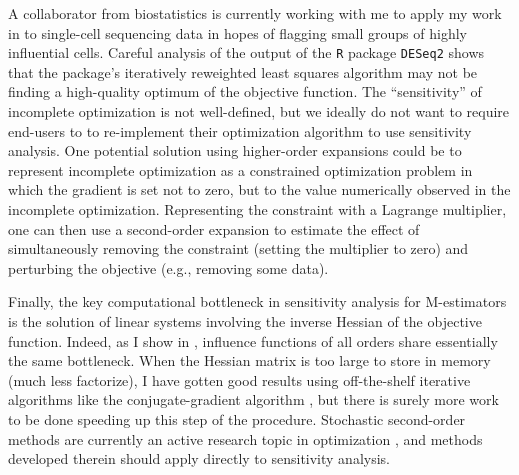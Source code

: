 A collaborator from biostatistics is currently working with me to apply my work
in \citet{giordano:2020:amip} to single-cell sequencing data in hopes of
flagging small groups of highly influential cells.  Careful analysis of the
output of the \texttt{R} package \texttt{DESeq2} \citep{deseq2} shows that the
package's iteratively reweighted least squares algorithm may not be finding a
high-quality optimum of the objective function.  The ``sensitivity'' of
incomplete optimization is not well-defined, but we ideally do not want to
require end-users to to re-implement their optimization algorithm to use
sensitivity analysis.  One potential solution using higher-order expansions
could be to represent incomplete optimization as a constrained optimization
problem in which the gradient is set not to zero, but to the value numerically
observed in the incomplete optimization.  Representing the constraint with a
Lagrange multiplier, one can then use a second-order expansion to estimate the
effect of simultaneously removing the constraint (setting the multiplier to
zero) and perturbing the objective (e.g., removing some data).

Finally, the key computational bottleneck in sensitivity analysis for
M-estimators is the solution of linear systems involving the inverse Hessian of
the objective function.  Indeed, as I show in \citet{giordano:2019:hoij},
influence functions of all orders share essentially the same bottleneck. When
the Hessian matrix is too large to store in memory (much less factorize), I have
gotten good results using off-the-shelf iterative algorithms like the
conjugate-gradient algorithm \citep{nocedal:2006:numerical}, but there is surely
more work to be done speeding up this step of the procedure.  Stochastic
second-order methods are currently an active research topic in optimization
\citep{agarwal:2017:secondorder, berahas:2020:newtonsketch}, and methods
developed therein should apply directly to sensitivity analysis.

\newpage





